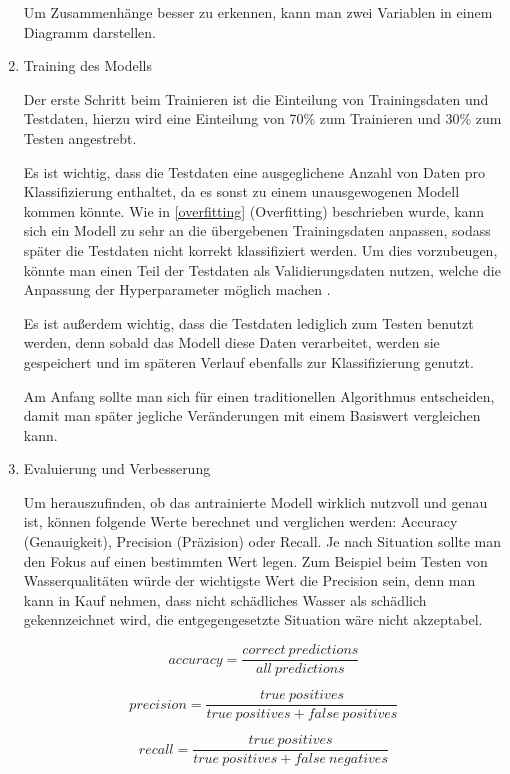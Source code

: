 \begin{enumerate}
            Um Zusammenhänge besser zu erkennen, kann man zwei Variablen in einem Diagramm darstellen.

      \item Training des Modells

            Der erste Schritt beim Trainieren ist die Einteilung von Trainingsdaten und Testdaten, hierzu wird eine Einteilung von 70\% zum Trainieren und 30\% zum Testen angestrebt.

            Es ist wichtig, dass die Testdaten eine ausgeglichene Anzahl von Daten pro Klassifizierung enthaltet, da es sonst zu einem unausgewogenen Modell kommen könnte. Wie in \ref{overfitting} (Overfitting) beschrieben wurde, kann sich ein Modell zu sehr an die übergebenen Trainingsdaten anpassen, sodass später die Testdaten nicht korrekt klassifiziert werden. Um dies vorzubeugen, könnte man einen Teil der Testdaten als Validierungsdaten nutzen, welche die Anpassung der Hyperparameter möglich machen \cite{DatenZumTrainieren}.

            Es ist außerdem wichtig, dass die Testdaten lediglich zum Testen benutzt werden, denn sobald das Modell diese Daten verarbeitet, werden sie gespeichert und im späteren Verlauf ebenfalls zur Klassifizierung genutzt.

            Am Anfang sollte man sich für einen traditionellen Algorithmus entscheiden, damit man später jegliche Veränderungen mit einem Basiswert vergleichen kann.

      \item Evaluierung und Verbesserung

            Um herauszufinden, ob das antrainierte Modell wirklich nutzvoll und genau ist, können folgende Werte berechnet und verglichen werden: Accuracy (Genauigkeit), Precision (Präzision) oder Recall. Je nach Situation sollte man den Fokus auf einen bestimmten Wert legen. Zum Beispiel beim Testen von Wasserqualitäten würde der wichtigste Wert die Precision sein, denn man kann in Kauf nehmen, dass nicht schädliches Wasser als schädlich gekennzeichnet wird, die entgegengesetzte Situation wäre nicht akzeptabel. \cite{APR}

            \begin{figure}[H]
                  \[ accuracy = \frac{correct\ predictions}{all\ predictions}  \]

                  \[ precision = \frac{true\ positives}{true\ positives + false\ positives}  \]

                  \[ recall = \frac{true\ positives}{true\ positives + false\ negatives}  \]


\end{figure}
\end{enumerate}
